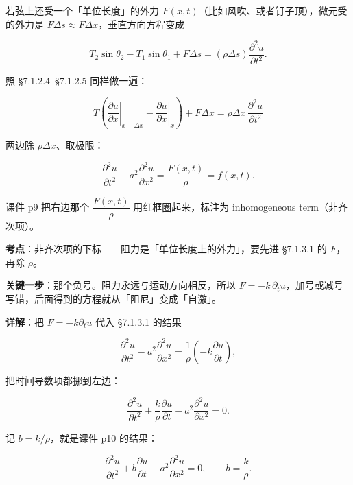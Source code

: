 \label{sec:713}



若弦上还受一个「单位长度」的外力 $F(x,t)$（比如风吹、或者钉子顶），微元受的外力是 $F\Delta s\approx F\Delta x$，垂直方向方程变成

\[
T_2\sin\theta_2-T_1\sin\theta_1+F\Delta s=(\rho\Delta s)\frac{\partial^2u}{\partial t^2}.
\]

照 §7.1.2.4--§7.1.2.5 同样做一遍：

\[
T\left(\left.\frac{\partial u}{\partial x}\right|_{x+\Delta x}-\left.\frac{\partial u}{\partial x}\right|_{x}\right)+F\Delta x
=\rho\Delta x\,\frac{\partial^2u}{\partial t^2}
\]

两边除 $\rho\Delta x$、取极限：

\[
\frac{\partial^2u}{\partial t^2}-a^2\frac{\partial^2u}{\partial x^2}
=\frac{F(x,t)}{\rho}=f(x,t).
\]

课件 p9 把右边那个 $\dfrac{F(x,t)}{\rho}$ 用红框圈起来，标注为 inhomogeneous term（非齐次项）。



\qbreak
{}

\textbf{考点}：非齐次项的下标——阻力是「单位长度上的外力」，要先进 §7.1.3.1 的 $F$，再除 $\rho$。

\textbf{关键一步}：那个负号。阻力永远与运动方向相反，所以 $F=-k\,\partial_t u$，加号或减号写错，后面得到的方程就从「阻尼」变成「自激」。

\textbf{详解}：把 $F=-k\partial_t u$ 代入 §7.1.3.1 的结果

\[
\frac{\partial^2u}{\partial t^2}-a^2\frac{\partial^2u}{\partial x^2}
=\frac{1}{\rho}\left(-k\frac{\partial u}{\partial t}\right),
\]

把时间导数项都挪到左边：

\[
\frac{\partial^2u}{\partial t^2}+\frac{k}{\rho}\frac{\partial u}{\partial t}
-a^2\frac{\partial^2u}{\partial x^2}=0 .
\]

记 $b=k/\rho$，就是课件 p10 的结果：

\[
\frac{\partial^2u}{\partial t^2}+b\frac{\partial u}{\partial t}-a^2\frac{\partial^2u}{\partial x^2}=0,
\qquad b=\frac{k}{\rho}.
\]


